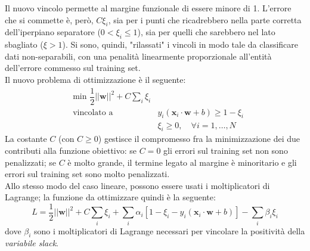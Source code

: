 Il nuovo vincolo permette al margine funzionale di essere minore di 1. L'errore che si commette è, però, $C\xi_i$, sia per i punti che ricadrebbero nella parte corretta dell'iperpiano separatore ($0<\xi_i\leq1$), sia per quelli che sarebbero nel lato sbagliato ($\xi>1$).
Si sono, quindi, "rilassati" i vincoli in modo tale da classificare dati non-separabili, con una penalità linearmente proporzionale all'entità dell'errore commesso sul training set.\\

Il nuovo problema di ottimizzazione è il seguente:
\begin{eqnarray}
\label{eq:ottimizzazione_softmargin}
&\text{min }\dfrac{1}{2}\vert\vert\mathbf{w}\vert\vert^2+C\sum_i\xi_i\\
&\text{vincolato a }&y_i\left (\mathbf{x}_i\cdot\mathbf{w}+b \right )\geq1-\xi_i\\
&& \xi_i\geq0, \quad \forall i=1,\ldots,N
\end{eqnarray}
La costante $C$ (con $C\geq0$) gestisce il compromesso fra la minimizzazione dei due contributi alla funzione obiettivo: se $C=0$ gli errori sul training set non sono penalizzati; se $C$ è molto grande, il termine legato al margine è minoritario e gli errori sul training set sono molto penalizzati.
\\
Allo stesso modo del caso lineare, possono essere usati i moltiplicatori di Lagrange; la funzione da ottimizzare quindi è la seguente:
\begin{equation}
\label{eq:lagrangiana_sofmargin}
L=\dfrac{1}{2}\vert\vert\mathbf{w}\vert\vert^2+C\sum_i\xi_i+\sum_i\alpha_i\left [1-\xi_i-y_i\left (\mathbf{x}_i\cdot\mathbf{w}+b \right )\right ]-\sum_i\beta_i\xi_i
\end{equation}
dove $\beta_i$ sono i moltiplicatori di Lagrange necessari per vincolare la positività della \emph{variabile slack}.	
\\

